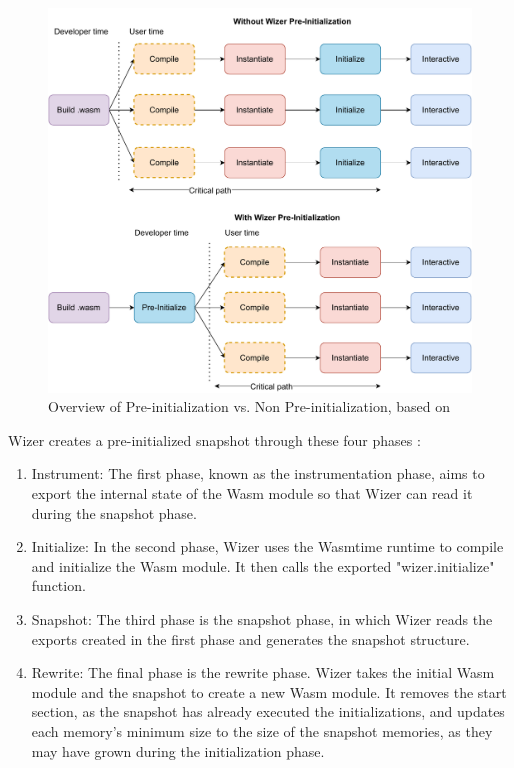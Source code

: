 \begin{figure}[H]
	\centering
	\includegraphics[width=1\linewidth]{images/runtimes/Wizer.drawio.pdf}
	\caption{Overview of Pre-initialization vs. Non Pre-initialization, based on \cite{fitzgerald_2021_hit}}
	\label{fig:wizer}
\end{figure}

Wizer creates a pre-initialized snapshot through these four phases \cite{fitzgerald_2021_hit}:
\begin{enumerate}
	\item Instrument: The first phase, known as the instrumentation phase, aims to export the internal state of the Wasm module so that Wizer can read it during the snapshot phase.
	\item Initialize: In the second phase, Wizer uses the Wasmtime runtime to compile and initialize the Wasm module. It then calls the exported "wizer.initialize" function.
	\item Snapshot: The third phase is the snapshot phase, in which Wizer reads the exports created in the first phase and generates the snapshot structure.
	\item Rewrite: The final phase is the rewrite phase. Wizer takes the initial Wasm module and the snapshot to create a new Wasm module. It removes the start section, as the snapshot has already executed the initializations, and updates each memory's minimum size to the size of the snapshot memories, as they may have grown during the initialization phase.
\end{enumerate}


